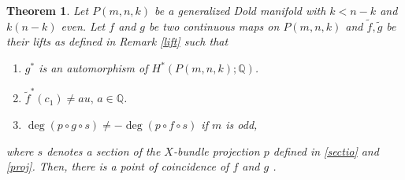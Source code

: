 \documentclass{amsart}
\newtheorem{theorem}{Theorem}[section]
\begin{document}
\begin{theorem}\label{coincidence thm}
	Let $P(m,n,k)$ be a generalized Dold manifold with $k<n-k$ and $k(n-k)$ even. Let $f$ and $g$ be two continuous maps on $P(m,n,k)$ and $\tilde f, \tilde g$ be their lifts as defined in  Remark \ref{lift} such %
that
	\begin{enumerate}	
		\item $g^*$ is an automorphism of $H^*(P(m,n,k);\mathbb Q)$. 
		\item $\tilde{f}^*(c_1) \neq au,\, a \in \mathbb{Q}$.
		\item $\deg(p\circ g \circ s)\neq -\deg (p\circ f\circ s)$ %
if $m$ %
is odd,
	\end{enumerate}
	where %
$s$ denotes a section of the $X$-bundle projection $p$ defined in \eqref{sectio} and \eqref{proj}.	Then, there is a point of coincidence of $f$ and  $g$%
.
\end{theorem}
\end{document}
